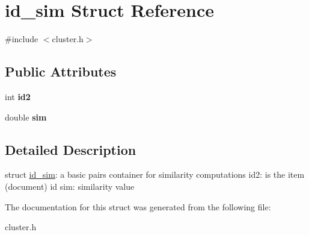 \hypertarget{structid__sim}{
\section{id\_\-sim Struct Reference}
\label{structid__sim}
}


{\ttfamily \#include $<$cluster.h$>$}

\subsection*{Public Attributes}
\begin{DoxyCompactItemize}
\item 
\hypertarget{structid__sim_a9b905ceda8977fb5b62f273de1b81d53}{
int {\bfseries id2}}
\label{structid__sim_a9b905ceda8977fb5b62f273de1b81d53}

\item 
\hypertarget{structid__sim_a3f765fa7df10e4f45c70040393b1912c}{
double {\bfseries sim}}
\label{structid__sim_a3f765fa7df10e4f45c70040393b1912c}

\end{DoxyCompactItemize}


\subsection{Detailed Description}
struct \hyperlink{structid__sim}{id\_\-sim}: a basic pairs container for similarity computations id2: is the item (document) id sim: similarity value 

The documentation for this struct was generated from the following file:\begin{DoxyCompactItemize}
\item 
cluster.h\end{DoxyCompactItemize}
